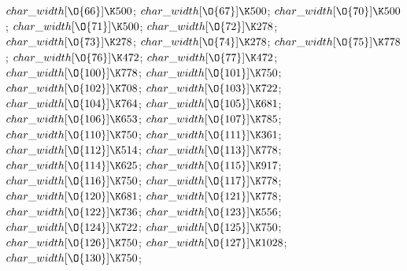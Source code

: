 $\\{char\_width}[\O{66}]\K500$;\5
$\\{char\_width}[\O{67}]\K500$;\5
$\\{char\_width}[\O{70}]\K500$;\5
$\\{char\_width}[\O{71}]\K500$;\5
$\\{char\_width}[\O{72}]\K278$;\5
$\\{char\_width}[\O{73}]\K278$;\5
$\\{char\_width}[\O{74}]\K278$;\5
$\\{char\_width}[\O{75}]\K778$;\5
$\\{char\_width}[\O{76}]\K472$;\5
$\\{char\_width}[\O{77}]\K472$;\5
$\\{char\_width}[\O{100}]\K778$;\5
$\\{char\_width}[\O{101}]\K750$;\5
$\\{char\_width}[\O{102}]\K708$;\5
$\\{char\_width}[\O{103}]\K722$;\5
$\\{char\_width}[\O{104}]\K764$;\5
$\\{char\_width}[\O{105}]\K681$;\5
$\\{char\_width}[\O{106}]\K653$;\5
$\\{char\_width}[\O{107}]\K785$;\5
$\\{char\_width}[\O{110}]\K750$;\5
$\\{char\_width}[\O{111}]\K361$;\5
$\\{char\_width}[\O{112}]\K514$;\5
$\\{char\_width}[\O{113}]\K778$;\5
$\\{char\_width}[\O{114}]\K625$;\5
$\\{char\_width}[\O{115}]\K917$;\5
$\\{char\_width}[\O{116}]\K750$;\5
$\\{char\_width}[\O{117}]\K778$;\5
$\\{char\_width}[\O{120}]\K681$;\5
$\\{char\_width}[\O{121}]\K778$;\5
$\\{char\_width}[\O{122}]\K736$;\5
$\\{char\_width}[\O{123}]\K556$;\5
$\\{char\_width}[\O{124}]\K722$;\5
$\\{char\_width}[\O{125}]\K750$;\5
$\\{char\_width}[\O{126}]\K750$;\5
$\\{char\_width}[\O{127}]\K1028$;\5
$\\{char\_width}[\O{130}]\K750$;\5
